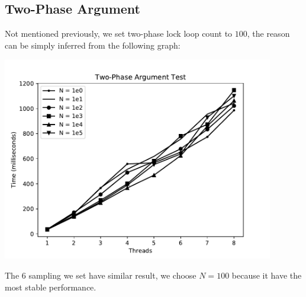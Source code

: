 \documentclass{article}
\begin{document}
\subsection{Two-Phase Argument}
Not mentioned previously, we set two-phase lock loop count to $100$, the reason can be simply inferred from the following graph:\\
\begin{center}
\includegraphics[height=24em]{OSLAB4_ARG.pdf}
\end{center}
The $6$ sampling we set have similar result, we choose $N=100$ because it have the most stable performance.
\end{document}
